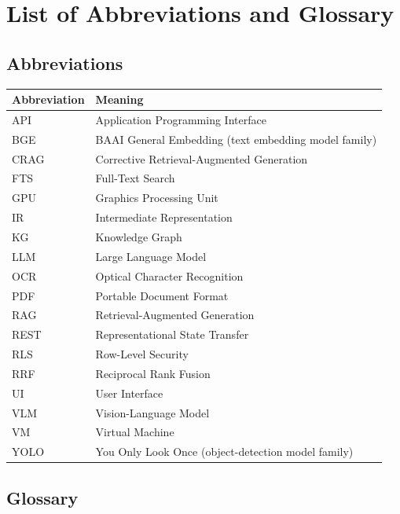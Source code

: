 \chapter*{List of Abbreviations and Glossary}

\section*{Abbreviations}

\begin{table}[H]
  \centering
  \small
  \begin{tabularx}{\textwidth}{@{}p{}X@{}}
    \toprule
    \textbf{Abbreviation} & \textbf{Meaning} \\
    \midrule
    API   & Application Programming Interface \\
    BGE   & BAAI General Embedding (text embedding model family) \\
    CRAG  & Corrective Retrieval-Augmented Generation \\
    FTS   & Full-Text Search \\
    GPU   & Graphics Processing Unit \\
    IR    & Intermediate Representation \\
    KG    & Knowledge Graph \\
    LLM   & Large Language Model \\
    OCR   & Optical Character Recognition \\
    PDF   & Portable Document Format \\
    RAG   & Retrieval-Augmented Generation \\
    REST  & Representational State Transfer \\
    RLS   & Row-Level Security \\
    RRF   & Reciprocal Rank Fusion \\
    UI    & User Interface \\
    VLM   & Vision-Language Model \\
    VM    & Virtual Machine \\
    YOLO  & You Only Look Once (object-detection model family) \\
    \bottomrule
  \end{tabularx}
\end{table}

\section*{Glossary}

